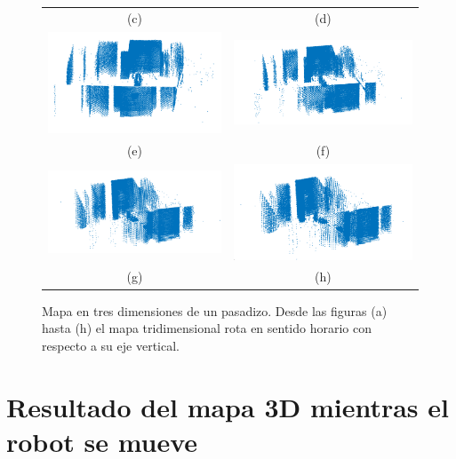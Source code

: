 \begin{figure}
\begin{tabular}{cc}
      (c)&(d)\\
      \includegraphics[width=.52\textwidth]{images/pasadizo_4.png}&
      \includegraphics[width=.52\textwidth]{images/pasadizo_3.png}\\
      (e)&(f)\\
      \includegraphics[width=.52\textwidth]{images/pasadizo_2.png}&
      \includegraphics[width=.52\textwidth]{images/pasadizo_1.png}\\
      (g)&(h)
    \end{tabular}
  \captionsetup{font=footnotesize}
    \caption{\label{fig:pasadizo3D}Mapa en tres dimensiones de un pasadizo. Desde 
    las figuras (a) hasta (h) el mapa tridimensional rota en sentido horario con respecto
    a su eje vertical.}
\end{figure}

\section{Resultado del mapa 3D mientras el robot se mueve}

